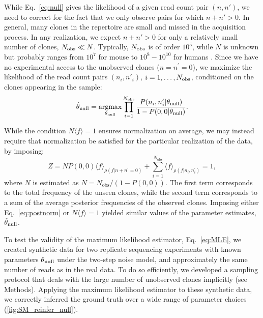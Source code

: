 \documentclass[pre,twocolumn,english,longbibliography]{revtex4}
\DeclareMathOperator*{\argmax}{argmax}
\newcommand{\beq}{\begin{equation}}
\newcommand{\eeq}{\end{equation}}
\newcommand{\<}{\langle}
\renewcommand{\>}{\rangle}
\begin{document}
While Eq.~\ref{eq:null} gives the likelihood of a given read count pair $(n,n')$, we need to correct for the fact that we only observe pairs for which $n+n'>0$. In general,
many clones in the repertoire are small and missed in the acquisition process. In any realization, we expect $n+n'>0$ for only a relatively small number of clones, $N_{\rm obs}\ll N$. Typically, $N_{\rm obs}$ is of order $10^5$, while $N$ is unknown but probably ranges from $10^7$ for mouse to $10^8-10^{10}$ for humans \cite{Qi2014,Lythe2016}. Since we have no experimental access to the unobserved clones ($n=n^{\prime}=0$), we maximize the likelihood of the read count pairs $(n_i,n'_i)$, $i=1,\ldots,N_{\rm obs}$, conditioned on the clones appearing in the sample:
\beq\label{eq:MLE}
\hat\theta_{\rm null}=\argmax_{\theta_{\rm null}} \prod_{i=1}^{N_{\rm obs}} \frac{P(n_i,n'_i|\theta_{\rm null})}{1-P(0,0|\theta_{\rm null})}.
\eeq

While the condition $N\<f\>=1$ ensures normalization on average, we may instead require that normalization be satisfied for the particular realization of the data, by imposing:
\beq
	Z=N	P(0,0)\langle f\rangle_{\rho(f|n+n^{\prime}=0)} + \sum_{i=1}^{N_{\textrm{obs}}}\langle f\rangle_{\rho(f|n_i,n^{\prime}_i)}=1,\label{eq:postnorm}
\eeq
where $N$ is estimated as $N=N_{\textrm{obs}}/(1-P(0,0))$. The first term corresponds to the total frequency of the unseen clones, while the second term corresponds to a sum of the average posterior frequencies of the observed clones. Imposing either Eq.~\ref{eq:postnorm} or $N\<f\>=1$ yielded similar values of the parameter estimates, $\hat\theta_{\rm null}$.

To test the validity of the maximum likelihood estimator, Eq.~\ref{eq:MLE}, we created synthetic data for two replicate sequencing experiments with known parameters $\theta_{\rm null}$ under the two-step noise model, and approximately the same number of reads as in the real data.
To do so efficiently, we developed a sampling protocol that deals with the large number of unobserved clones implicitly (see Methods).
Applying the maximum likelihood estimator to these synthetic data, we correctly inferred the ground truth over a wide range of parameter choices (\cref{fig:SM_reinfer_null}).
\end{document}
